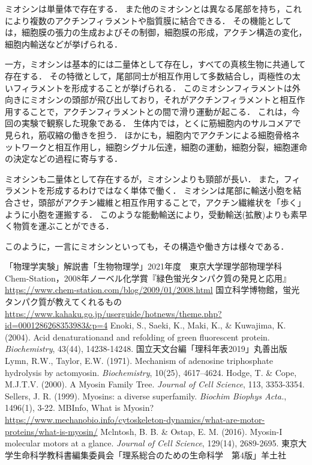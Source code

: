 \documentclass[a4paper,11pt, titlepage]{jsarticle}
\begin{document}
ミオシンは単量体で存在する．
また他のミオシンとは異なる尾部を持ち，これにより複数のアクチンフィラメントや脂質膜に結合できる．
その機能としては，細胞膜の張力の生成およびその制御，細胞膜の形成，アクチン構造の変化，細胞内輸送などが挙げられる．

一方，ミオシンは基本的には二量体として存在し，すべての真核生物に共通して存在する．
その特徴として，尾部同士が相互作用して多数結合し，両極性の太いフィラメントを形成することが挙げられる．
このミオシンフィラメントは外向きにミオシンの頭部が飛び出しており，それがアクチンフィラメントと相互作用することで，アクチンフィラメントとの間で滑り運動が起こる．
これは，今回の実験で観察した現象である．
生体内では，とくに筋細胞内のサルコメアで見られ，筋収縮の働きを担う．
ほかにも，細胞内でアクチンによる細胞骨格ネットワークと相互作用し，細胞シグナル伝達，細胞の運動，細胞分裂，細胞運命の決定などの過程に寄与する．

ミオシンも二量体として存在するが，ミオシンよりも頸部が長い．
また，フィラメントを形成するわけではなく単体で働く．
ミオシンは尾部に輸送小胞を結合させ，頭部がアクチン繊維と相互作用することで，アクチン繊維状を「歩く」ように小胞を運搬する．
このような能動輸送により，受動輸送(拡散)よりも素早く物質を運ぶことができる．

このように，一言にミオシンといっても，その構造や働き方は様々である．

\begin{thebibliography}{99}
        「物理学実験」解説書「生物物理学」2021年度　東京大学理学部物理学科
        Chem-Station，2008年ノーベル化学賞『緑色蛍光タンパク質の発見と応用』\\
        \url{https://www.chem-station.com/blog/2009/01/2008.html}
        国立科学博物館，蛍光タンパク質が教えてくれるもの
        \url{https://www.kahaku.go.jp/userguide/hotnews/theme.php?id=0001286268353983&p=4}
        Enoki, S., Saeki, K., Maki, K., \& Kuwajima, K. (2004). Acid denaturationand and refolding of green fluorescent protein. \textit{Biochemistry}, 43(44), 14238-14248.
        国立天文台編「理科年表2019」丸善出版
        Lymn, R.W., Taylor, E.W. (1971). Mechanism of adenosine triphosphate hydrolysis by actomyosin. \textit{Biochemistry}, 10(25), 4617–4624.
        Hodge, T. \& Cope, M.J.T.V. (2000). A Myosin Family Tree. \textit{Journal of Cell Science}, 113, 3353-3354.
        Sellers, J. R. (1999). Myosins: a diverse superfamily. \textit{Biochim Biophys Acta.}, 1496(1), 3-22.
        MBInfo, What is Myosin? 
        \url{https://www.mechanobio.info/cytoskeleton-dynamics/what-are-motor-proteins/what-is-myosin/}
        Mclntosh, B. B. \& Ostap, E. M. (2016). Myosin-I molecular motors at a glance. \textit{Journal of Cell Science}, 129(14), 2689-2695. 
        東京大学生命科学教科書編集委員会「理系総合のための生命科学　第4版」羊土社


\end{thebibliography}
\end{document}
